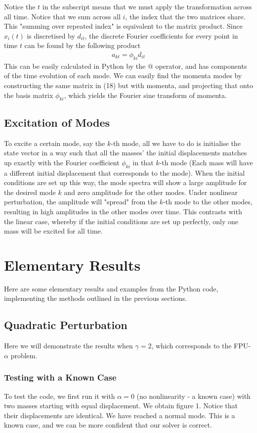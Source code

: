 \documentclass{article}
\begin{document}
Notice the $t$ in the subscript means that we must apply the transformation across 
all time. Notice that we sum across all $i$, the index that the two matrices share. 
This "summing over repeated index"
is equivalent to the matrix product. Since $x_{i}(t)$ is discretised by $d_{it}$,
 the discrete Fourier coefficients for every point in time $t$ can be found by 
the following product 
\begin{align}
    a_{kt}=\phi_{ki}d_{it}
\end{align}
This can be easily calculated in Python by the $@$ operator, and has components of the time 
evolution of each mode. We can easily find the momenta modes by constructing the same matrix 
in (18) but with momenta, and projecting that onto the basis matrix $\phi_{ki}$, which yields 
the Fourier sine transform of momenta.

\subsection{Excitation of Modes}
To excite a certain mode, say the $k$-th mode, 
all we have to do is initialise the state vector 
in a way such that all the masses'
the initial displacements matches up
 exactly with the Fourier coefficient $\phi_{ki}$ in that $k$-th mode (Each mass
 will have a different initial displacement that corresponds to the mode). When the initial conditions are set up this way, the mode spectra 
will show a large amplitude for the desired mode $k$ and zero amplitude
 for the other modes.
Under nonlinear perturbation, 
the amplitude will "spread" from 
the $k$-th mode to the other modes, 
resulting in high amplitudes in the other modes over time. This contrasts with the linear case, 
whereby if the initial conditions are set up perfectly, 
only one mass will be excited for all time.
\section{Elementary Results}
Here are some elementary results and examples from the Python code, implementing the methods outlined in the previous sections.
\subsection{Quadratic Perturbation}
Here we will demonstrate the results when $\gamma=2$, which corresponds to the FPU-$\alpha$ problem.
\subsubsection{Testing with a Known Case}
To test the code, we first run it with $\alpha=0$ (no nonlinearity - a known case) with two masses 
starting with equal displacement. We obtain figure 1.
Notice that their displacements are identical. We have reached a normal mode. This is 
a known case, and we can be more confident that our solver is correct.
\end{document}
